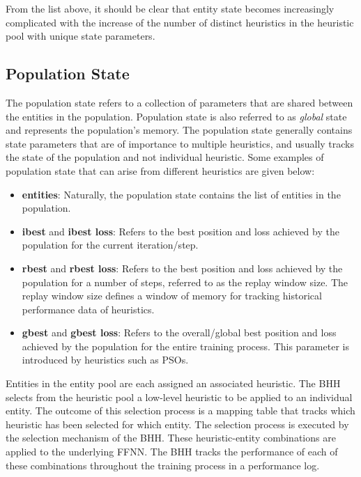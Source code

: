From the list above, it should be clear that entity state becomes increasingly complicated with the increase of the number of distinct heuristics in the heuristic pool with unique state parameters.

\subsection{Population State}\label{sec:bhh:entity_pool:population_state}

The population state refers to a collection of parameters that are shared between the entities in the population. Population state is also referred to as \textit{global} state and represents the population's memory. The population state generally contains state parameters that are of importance to multiple heuristics, and usually tracks the state of the population and not individual heuristic. Some examples of population state that can arise from different heuristics are given below:

\begin{itemize}
      \item \textbf{entities}: Naturally, the population state contains the list of entities in the population.

      \item \textbf{ibest} and \textbf{ibest loss}: Refers to the best position and loss achieved by the population for the current iteration/step.

      \item \textbf{rbest} and \textbf{rbest loss}: Refers to the best position and loss achieved by the population for a number of steps, referred to as the replay window size. The replay window size defines a window of memory for tracking historical performance data of heuristics.

      \item \textbf{gbest} and \textbf{gbest loss}: Refers to the overall/global best position and loss achieved by the population for the entire training process. This parameter is introduced by heuristics such as \acp{PSO}.
\end{itemize}

Entities in the entity pool are each assigned an associated heuristic. The \acs{BHH} selects from the heuristic pool a low-level heuristic to be applied to an individual entity. The outcome of this selection process is a mapping table that tracks which heuristic has been selected for which entity. The selection process is executed by the selection mechanism of the \acs{BHH}. These heuristic-entity combinations are applied to the underlying \acs{FFNN}. The \acs{BHH} tracks the performance of each of these combinations throughout the training process in a performance log.


